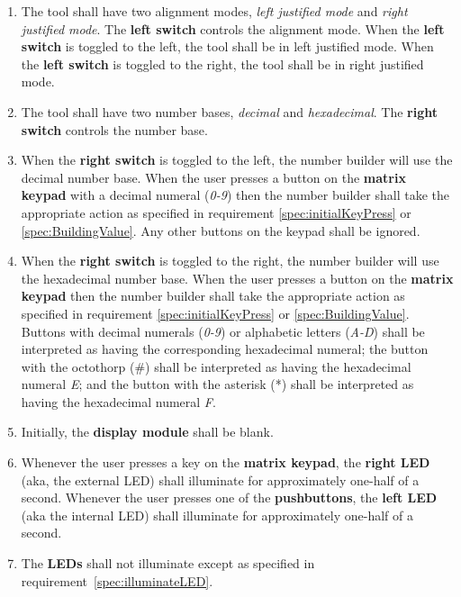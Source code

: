 \begin{enumerate}
\item The tool shall have two alignment modes, \textit{left justified mode} and
    \textit{right justified mode}. The \textbf{left switch} controls the alignment mode.
    When the \textbf{left switch} is toggled to the left, the tool shall be in left justified mode.
    When the \textbf{left switch} is toggled to the right, the tool shall be in right justified mode.
\item The tool shall have two number bases, \textit{decimal} and
    \textit{hexadecimal}. The \textbf{right switch} controls the number base.
\item \label{spec:decimalExplained} When the \textbf{right switch} is toggled
    to the left, the number builder will use the decimal number base. When the
    user presses a button on the \textbf{matrix keypad} with a decimal numeral
    (\textit{0-9}) then the number builder shall take the appropriate action as
    specified in requirement \ref{spec:initialKeyPress} or
    \ref{spec:BuildingValue}. Any other buttons on the keypad shall be ignored.
\item \label{spec:hexadecimalExplained} When the \textbf{right switch} is
    toggled to the right, the number builder will use the hexadecimal number
    base. When the user presses a button on the \textbf{matrix keypad} then the
    number builder shall take the appropriate action as specified in
    requirement \ref{spec:initialKeyPress} or \ref{spec:BuildingValue}.
    Buttons with decimal numerals (\textit{0-9}) or alphabetic letters
    (\textit{A-D}) shall be interpreted as having the corresponding hexadecimal
    numeral; the button with the octothorp (\#) shall be interpreted as having
    the hexadecimal numeral \textit{E}; and the button with the asterisk (*)
    shall be interpreted as having the hexadecimal numeral \textit{F}.
\item Initially, the \textbf{display module} shall be blank.
\item \label{spec:illuminateLED} Whenever the user presses a key on the
    \textbf{matrix keypad}, the \textbf{right LED} (aka, the external LED) shall
    illuminate for approximately one-half of a second. Whenever the user presses
    one of the \textbf{pushbuttons}, the \textbf{left LED} (aka the internal LED)
    shall illuminate for approximately one-half of a second.
\item The \textbf{LEDs} shall not illuminate except as specified in
    requirement~\ref{spec:illuminateLED}.

\end{enumerate}
